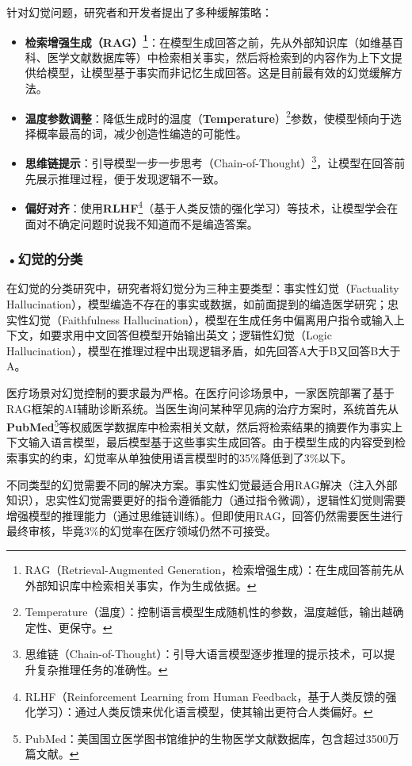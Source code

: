 针对幻觉问题，研究者和开发者提出了多种缓解策略：
\begin{itemize}
\item \textbf{检索增强生成（RAG）\footnote{RAG（Retrieval-Augmented Generation，检索增强生成）：在生成回答前先从外部知识库中检索相关事实，作为生成依据。}}：在模型生成回答之前，先从外部知识库（如维基百科、医学文献数据库等）中检索相关事实，然后将检索到的内容作为上下文提供给模型，让模型基于事实而非记忆生成回答。这是目前最有效的幻觉缓解方法。
\item \textbf{温度参数调整}：降低生成时的温度（\textbf{Temperature}）\footnote{Temperature（温度）：控制语言模型生成随机性的参数，温度越低，输出越确定性、更保守。}参数，使模型倾向于选择概率最高的词，减少创造性编造的可能性。
\item \textbf{思维链提示}：引导模型一步一步思考（Chain-of-Thought）\footnote{思维链（Chain-of-Thought）：引导大语言模型逐步推理的提示技术，可以提升复杂推理任务的准确性。}，让模型在回答前先展示推理过程，便于发现逻辑不一致。
\item \textbf{偏好对齐}：使用\textbf{RLHF}\footnote{RLHF（Reinforcement Learning from Human Feedback，基于人类反馈的强化学习）：通过人类反馈来优化语言模型，使其输出更符合人类偏好。}（基于人类反馈的强化学习）等技术，让模型学会在面对不确定问题时说我不知道而不是编造答案。
\end{itemize}


\subsubsection*{\textbf{•幻觉的分类}}
在幻觉的分类研究中，研究者将幻觉分为三种主要类型：事实性幻觉（Factuality Hallucination），模型编造不存在的事实或数据，如前面提到的编造医学研究；忠实性幻觉（Faithfulness Hallucination），模型在生成任务中偏离用户指令或输入上下文，如要求用中文回答但模型开始输出英文；逻辑性幻觉（Logic Hallucination），模型在推理过程中出现逻辑矛盾，如先回答A大于B又回答B大于A。

医疗场景对幻觉控制的要求最为严格。在医疗问诊场景中，一家医院部署了基于RAG框架的AI辅助诊断系统。当医生询问某种罕见病的治疗方案时，系统首先从\textbf{PubMed}\footnote{PubMed：美国国立医学图书馆维护的生物医学文献数据库，包含超过3500万篇文献。

}等权威医学数据库中检索相关文献，然后将检索结果的摘要作为事实上下文输入语言模型，最后模型基于这些事实生成回答。由于模型生成的内容受到检索事实的约束，幻觉率从单独使用语言模型时的35\%降低到了3\%以下。

不同类型的幻觉需要不同的解决方案。事实性幻觉最适合用RAG解决（注入外部知识），忠实性幻觉需要更好的指令遵循能力（通过指令微调），逻辑性幻觉则需要增强模型的推理能力（通过思维链训练）。但即使用RAG，回答仍然需要医生进行最终审核，毕竟3\%的幻觉率在医疗领域仍然不可接受。

